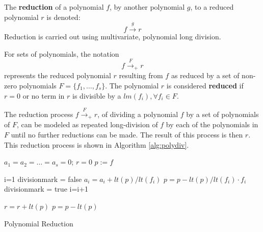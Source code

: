 \begin{Definition}
    The {\bf reduction} of a polynomial $f$, by another polynomial $g$, to
    a reduced polynomial $r$ is denoted:
    \begin{equation*}
        f\stackrel{g}{\textstyle\longrightarrow}r
    \end{equation*}
    Reduction is carried out using multivariate, polynomial long division. 
  
    For sets of polynomials, the notation 
    \begin{equation*}
    f\stackrel{F}{\textstyle\longrightarrow}_+r    
    \end{equation*}
    represents the reduced polynomial $r$ resulting from $f$ as reduced by a 
    set of non-zero polynomials $F = \{f_1,\dots,f_s\}$.  The polynomial $r$ is considered {\bf reduced} if 
    $r = 0$  or no term in $r$ is divisible  by a $lm(f_i), \forall f_i \in F$.
\end{Definition}

The reduction process $f\stackrel{F}{\textstyle\longrightarrow}_+r$, of 
dividing a polynomial $f$ by a set of polynomials of $F$, can be modeled as
repeated long-division of $f$ by each of the polynomials in $F$ until no
further reductions can be made. The result of this process is then $r$.
This reduction process is shown in Algorithm \ref{alg:polydiv}.

\begin{algorithm}[H]
\SetAlgoNoLine

 
 $a_{1}=a_{2}=\dots=a_{s}=0$; $r=0$\;
 $p:=f$\;
 
 {
	i=1\;
	divisionmark = false\;
	{
		{
			$a_{i}=a_{i}+lt(p)/lt(f_{i})$\;
			$p=p-lt(p)/lt(f_{i}) \cdot f_{i}$\;
			divisionmark = true\;
		}
		{
			i=i+1\;
		}
	}
	
	{
		$r=r+lt(p)$\;
		$p=p-lt(p)$\;
	}

 }
\caption{Polynomial Reduction}\label{alg:polydiv}
\end{algorithm}


